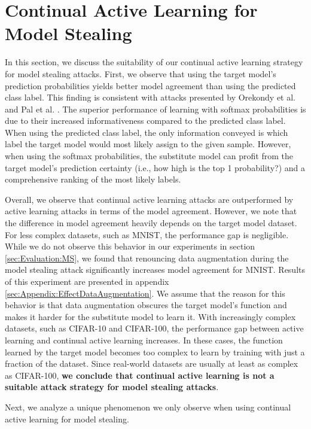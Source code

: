 \section{Continual Active Learning for Model Stealing}
\label{sec:Discussion:ModelStealing}
In this section, we discuss the suitability of our continual active learning strategy for model stealing attacks. First, we observe that using the target model's
prediction probabilities yields better model agreement than using the predicted class label. This finding is consistent with attacks presented by Orekondy et al.
\cite{orekondy2019knockoff} and Pal et al. \cite{pal2020activethief}. The superior performance of learning with softmax probabilities is due to their increased
informativeness compared to the predicted class label. When using the predicted class label, the only information conveyed is which label the target model would 
most likely assign to the given sample. However, when using the softmax probabilities, the substitute model can profit from the target model's prediction certainty
(i.e., how high is the top 1 probability?) and a comprehensive ranking of the most likely labels. \par
Overall, we observe that continual active learning attacks are outperformed by active learning attacks in terms of the model agreement. However, we note that the
difference in model agreement heavily depends on the target model dataset. For less complex datasets, such as MNIST, the performance gap is negligible. While
we do not observe this behavior in our experiments in section \ref{sec:Evaluation:MS}, we found that renouncing data augmentation during the model stealing attack
significantly increases model agreement for MNIST. Results of this experiment are presented in
appendix \ref{sec:Appendix:EffectDataAugmentation}. We assume that the reason for this behavior is that data augmentation obscures the target model's function
and makes it harder for the substitute model to learn it. With increasingly complex datasets, such as CIFAR-10 and CIFAR-100, the performance gap between
active learning and continual active learning increases. In these cases, the function learned by the target model becomes too complex to learn by training with
just a fraction of the dataset. Since real-world datasets are usually at least as complex as CIFAR-100, \textbf{we conclude that continual active learning is not a suitable
attack strategy for model stealing attacks}. \par
Next, we analyze a unique phenomenon we only observe when using continual active learning for model stealing.
